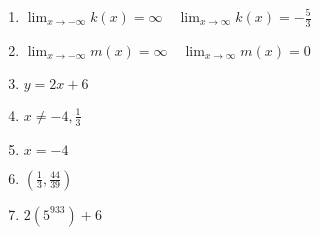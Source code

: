 \begin{enumerate}
    \item $\displaystyle \lim_{x \to -\infty} k(x) = \infty \quad \lim_{x \to \infty} k(x) = -\frac{5}{3}$
    \item $\displaystyle \lim_{x \to -\infty} m(x) = \infty \quad \lim_{x \to \infty} m(x) = 0$
    
    \item $y = 2x + 6$
    \item $x \neq -4, \frac{1}{3}$
    \item $x = -4$
    \item $\left(\frac{1}{3}, \frac{44}{39}\right)$
    \item $2\left(5^{933}\right) + 6$
\end{enumerate}
